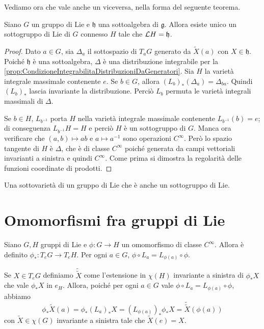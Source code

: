 Vediamo ora che vale anche un viceversa, nella forma del seguente teorema.
\begin{theorem}
	Siano $G$ un gruppo di Lie e $\mathfrak h$ una sottoalgebra di $\mathfrak g$. Allora esiste unico un sottogruppo di Lie di $G$ connesso $H$ tale che $\mathcal L H = \mathfrak h$.
\end{theorem}
\begin{proof}
	Dato $a \in G$, sia $\Delta_a$ il sottospazio di $T_aG$ generato da $\tilde X(a)$ con $X\in \mathfrak h$.
	Poiché $\mathfrak h$ è una sottoalgebra, $\Delta$ è una distribuzione integrabile per la \cref{prop:CondizioneIntegrabilitaDistribuzioniDaGeneratori}.
	Sia $H$ la varietà integrale massimale contenente $e$. Se $b \in G$, allora $(L_b)_* (\Delta_a) = \Delta_{ba}$. Quindi $(L_b)_*$ lascia invariante la distribuzione. Perciò $L_b$ permuta le varietà integrali massimali di $\Delta$.
	
	Se $b\in H$, $L_{b^{-1}}$ porta $H$ nella varietà integrale massimale contenente $L_{b^{-1}} (b) =e$; di conseguenza $L_{b^{-1}} H = H$ e perciò $H$ è un sottogruppo di $G$.
	Manca ora verificare che $(a,b) \mapsto ab$ e $a\mapsto a^{-1}$ sono operazioni $C^\infty$.
	Però lo spazio tangente di $H$ è $\Delta$, che è di classe $C^\infty$ poiché generata da campi vettoriali invarianti a sinistra e quindi $C^\infty$.
	Come prima si dimostra la regolarità delle funzioni coordinate di prodotti.
\end{proof}

\begin{remark}
	Una sottovarietà di un gruppo di Lie che è anche un sottogruppo di Lie.
\end{remark}

\section{Omomorfismi fra gruppi di Lie}

Siano $G,H$ gruppi di Lie e $\phi : G\to H$ un omomorfismo di classe $C^\infty$.
Allora è definito $\phi_* : T_eG \to T_eH$.
Per ogni $a \in G$, $\phi \circ L_a = L_{\phi(a)} \circ \phi$.

Se $X \in T_eG$ definiamo $\tilde{\tilde X}$ come l'estensione in $\chi(H)$ invariante a sinistra di $\phi_*X $ che vale $\phi_*X$ in $e_H$.
Allora, poiché per ogni $a \in G$ vale $\phi \circ L_a = L_{\phi(a)} \circ \phi$, abbiamo 
\begin{equation*}
\phi_* \tilde X(a) = \phi_* (L_a)_*X = (L_{\phi(a)})_* \phi_*X = \tilde{\tilde X} (\phi(a))
\end{equation*}
con $\tilde X\in\chi(G)$ invariante a sinistra tale che $\tilde X(e) = X$.

